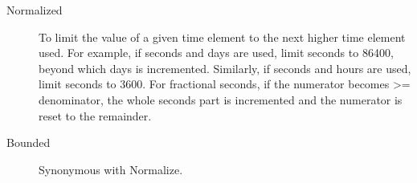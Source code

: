 
%
% 
%
%
%

\begin{description}

\item [Normalized] \label{glos:Normalized} To limit the value of a given
time element to the next higher time element used.  For example, if
seconds and days are used, limit seconds to 86400, beyond which days
is incremented.  Similarly, if seconds and hours are used, limit seconds
to 3600.  For fractional seconds, if the numerator becomes >= denominator,
the whole seconds part is incremented and the numerator is reset to the
remainder.

\item [Bounded] \label{glos:Bounded} Synonymous with Normalize.

\end{description}
